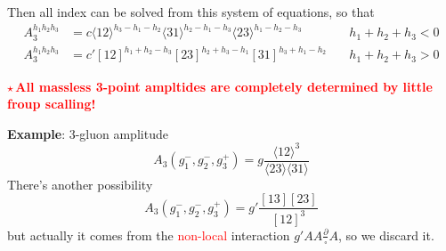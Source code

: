 \documentclass{beamer}
\newcommand{\avg}[1]{\langle #1 \rangle}
\begin{document}
\begin{frame}
    Then all index can be solved from this system of equations, so that
    \[
    \boxed{
    \begin{aligned}
        A_3^{h_1h_2h_3} &= c\avg{12}^{h_3-h_1-h_2}\avg{31}^{h_2-h_1-h_3}\avg{23}^{h_1-h_2-h_3}
        \quad & h_1+h_2+h_3 < 0 \\[0.5em]
        A_3^{h_1h_2h_3} &= c' [12]^{h_1+h_2-h_3}[23]^{h_2+h_3-h_1}[31]^{h_3+h_1-h_2}
        \quad & h_1+h_2+h_3 > 0
    \end{aligned}
        }
    \]

    \textbf{\textcolor{red}{$\star$\,All massless 3-point ampltides are completely determined by little froup scalling!}}
    
    \textbf{Example}: 3-gluon amplitude\\
    \begin{equation*}
        A_3(g_1^-,g_2^-,g_3^+)=g\frac{\avg{12}^3}{\avg{23}\!\avg{31}}
    \end{equation*}
    There's another possibility 
    \begin{equation*}
        A_3(g_1^-,g_2^-,g_3^+)=g'\frac{[13][23]}{[12]^3}
    \end{equation*}
    but actually it comes from the \textcolor{red}{non-local} interaction $g'AA\frac{\partial}{\square}A$, so we discard it.
\end{frame}
\end{document}
